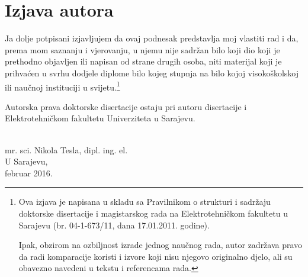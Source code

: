 \documentclass[12pt,oneside, a4paper]{book}
\begin{document}
\chapter*{Izjava autora}

Ja dolje potpisani izjavljujem da ovaj podnesak predstavlja moj vlastiti rad i da, prema mom saznanju i vjerovanju, u njemu nije sadržan bilo koji dio koji je prethodno objavljen ili napisan od strane drugih osoba, niti materijal koji je prihvaćen u svrhu dodjele diplome bilo kojeg stupnja na bilo kojoj visokoškolskoj ili naučnoj instituciji u svijetu.\footnote{Ova izjava je napisana u skladu sa Pravilnikom o strukturi i sadržaju doktorske disertacije i magistarskog rada na Elektrotehničkom fakultetu u Sarajevu (br. 04-1-673/11, dana 17.01.2011. godine).

Ipak, obzirom na ozbiljnost izrade jednog naučnog rada, autor zadržava pravo da radi komparacije koristi i izvore koji nisu njegovo originalno djelo, ali su obavezno navedeni u tekstu i referencama rada.}

Autorska prava doktorske disertacije ostaju pri autoru disertacije i Elektrotehničkom fakultetu Univerziteta u Sarajevu.

\begin{center}
\vspace{3cm}
\makebox[8cm]{\hrulefill} \\
mr. sci. Nikola Tesla, dipl. ing. el.\\
\vspace{8cm}
U Sarajevu,\\
februar 2016.
\end{center}





\tableofcontents
\listoffigures
{}
\listoftables
{}
\printindex 
\end{document}
